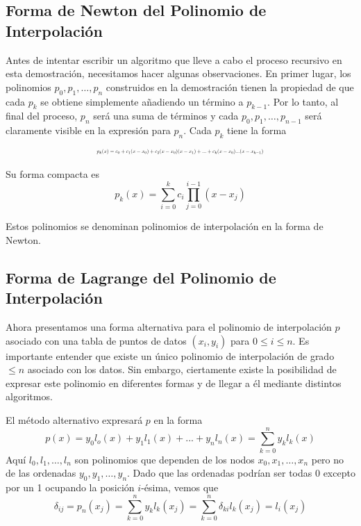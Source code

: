 \subsection{Forma de Newton del Polinomio de Interpolación}

Antes de intentar escribir un algoritmo que lleve a cabo el proceso recursivo en esta demostración, necesitamos hacer algunas observaciones. En primer lugar, los polinomios \( p_0, p_1, \ldots, p_n \) construidos en la demostración tienen la propiedad de que cada \( p_k \) se obtiene simplemente añadiendo un término a \( p_{k-1} \). Por lo tanto, al final del proceso, \( p_n \) será una suma de términos y cada \( p_0, p_1, \ldots, p_{n-1} \) será claramente visible en la expresión para \( p_n \). Cada \( p_k \) tiene la forma
\begin{equation}
    \label{eq: Kincaid 3}
    \resizebox{0.5 \textwidth}{!}{$p_k(x) = c_0 + c_1 (x - x_0) + c_2 (x - x_0) (x - x_1) + ... + c_k (x - x_0) ...(x - x_{k - 1})$}
\end{equation}

Su forma compacta es
\begin{equation}
    \label{eq: Kincaid 4}
    p_k (x) = \sum_{i = 0}^{k} c_i \prod_{j = 0}^{i - 1} (x - x_j)
\end{equation}

Estos polinomios se denominan polinomios de interpolación en la forma de Newton.

\subsection{Forma de Lagrange del Polinomio de Interpolación}
Ahora presentamos una forma alternativa para el polinomio de interpolación \( p \) asociado con una tabla de puntos de datos \((x_i, y_i)\) para \( 0 \leq i \leq n \). Es importante entender que existe un único polinomio de interpolación de grado \(\leq n\) asociado con los datos. Sin embargo, ciertamente existe la posibilidad de expresar este polinomio en diferentes formas y de llegar a él mediante distintos algoritmos.

El método alternativo expresará \( p \) en la forma
\begin{equation}
    \label{eq: Kincaid 9}
    p(x) = y_0 l_o(x) + y_1 l_1(x) +...+ y_n l_n(x) = \sum_{k = 0}^{n} y_k l_k(x)
\end{equation}
Aquí \( l_0, l_1, \ldots, l_n \) son polinomios que dependen de los nodos \( x_0, x_1, \ldots, x_n \) pero no de las ordenadas \( y_0, y_1, \ldots, y_n \).  
Dado que las ordenadas podrían ser todas 0 excepto por un 1 ocupando la posición \( i \)-ésima, vemos que
\[ \delta_{ij} = p_n (x_j) = \sum_{k = 0}^{n} y_k l_k(x_j) = \sum_{k = 0}^{n} \delta_{ki} l_k(x_j) = l_i(x_j) \]

